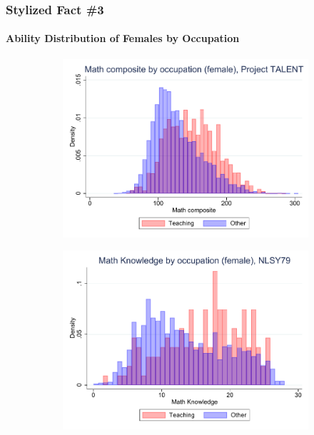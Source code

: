 \documentclass[11pt]{beamer}
\begin{document}
\begin{frame}
\frametitle{Stylized Fact \#3}
\framesubtitle{Ability Distribution of Females by Occupation}
	\begin{adjustwidth}{2em}{2em}
		\vfill
		\begin{figure}[ht!]
			\begin{subfigure}[b]{0.27\textwidth}
				\centering
				\includegraphics[width=\textwidth]{plots/TALENT_math_occ_no_norm_female_no_lf.pdf}
			\end{subfigure}
			\hfill
			\begin{subfigure}[b]{0.27\textwidth}
				\centering
				\includegraphics[width=\textwidth]{plots/nlsy79_mk_occ_no_norm_female_no_lf.pdf}
			\end{subfigure}
			\hfill
			\begin{subfigure}[b]{0.27\textwidth}

\end{subfigure}
\end{figure}
\end{adjustwidth}
\end{frame}
\end{document}
